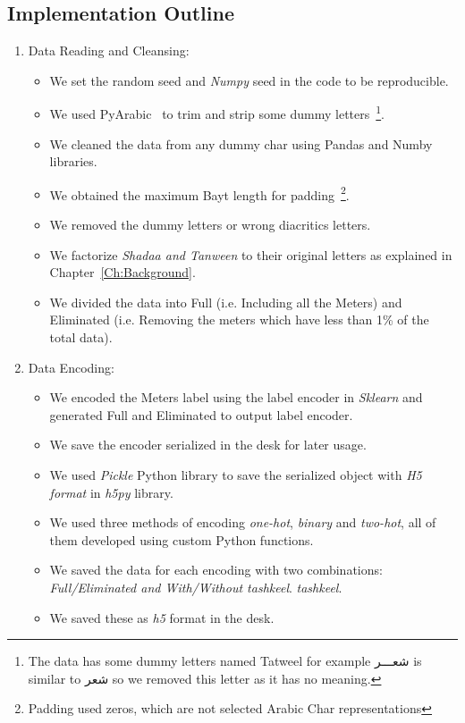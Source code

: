 {\subsection{Implementation Outline}

\begin{enumerate}
 \item Data Reading and Cleansing:
 \begin{itemize}
 \item We set the random seed and \textit{Numpy} seed in the code to be reproducible.
 \item We used PyArabic~\cite{Pyarabic_2010} to trim and strip some dummy letters~\footnote{The data has some dummy letters named Tatweel for example \textarabic{شعـــر} is similar to \textarabic{شعر} so we removed this letter as it has no meaning.}.
 \item We cleaned the data from any dummy char using Pandas and Numby libraries.
 \item We obtained the maximum Bayt length for padding~\footnote{Padding used zeros, which are not selected Arabic Char representations}.
 \item We removed the dummy letters or wrong diacritics letters.
 \item We factorize \textit{Shadaa and Tanween} to their original letters as explained in Chapter~\ref{Ch:Background}.
 \item We divided the data into Full (i.e. Including all the Meters) and Eliminated (i.e. Removing the meters which have less than 1\% of the total data).
 \end{itemize}
 
 \item Data Encoding:
 \begin{itemize}

 \item We encoded the Meters label using the label encoder in \textit{Sklearn} and generated Full and Eliminated to output label encoder.
 \item We save the encoder serialized in the desk for later usage.
 \item We used \textit{Pickle} Python library to save the serialized object with \textit{H5 format} in \textit{h5py} library.
 \item We used three methods of encoding \textit{one-hot}, \textit{binary} and \textit{two-hot}, all of them developed using custom Python functions.
 \item We saved the data for each encoding with two combinations: \textit{Full/Eliminated and With/Without \textit{tashkeel}}. \textit{tashkeel}.
 \item We saved these as \textit{h5} format in the desk.
 \end{itemize}


\end{enumerate}}
